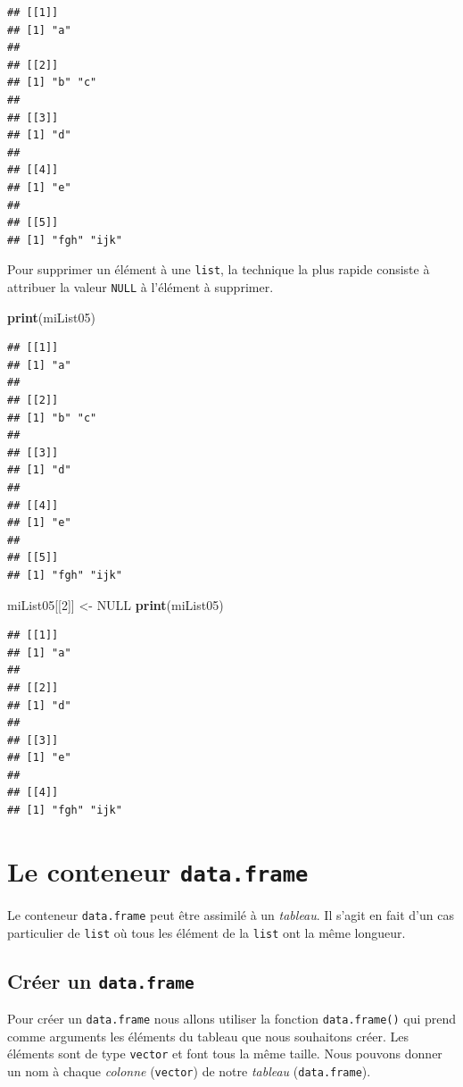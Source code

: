 \documentclass[]{book}
\newenvironment{Shaded}{\begin{snugshade}}{\end{snugshade}}
\newcommand{\KeywordTok}[1]{\textcolor[rgb]{0.13,0.29,0.53}{\textbf{#1}}}
\newcommand{\DecValTok}[1]{\textcolor[rgb]{0.00,0.00,0.81}{#1}}
\newcommand{\StringTok}[1]{\textcolor[rgb]{0.31,0.60,0.02}{#1}}
\newcommand{\OtherTok}[1]{\textcolor[rgb]{0.56,0.35,0.01}{#1}}
\newcommand{\NormalTok}[1]{#1}
\begin{document}
\begin{verbatim}
## [[1]]
## [1] "a"
## 
## [[2]]
## [1] "b" "c"
## 
## [[3]]
## [1] "d"
## 
## [[4]]
## [1] "e"
## 
## [[5]]
## [1] "fgh" "ijk"
\end{verbatim}

Pour supprimer un élément à une \texttt{list}, la technique la plus
rapide consiste à attribuer la valeur \texttt{NULL} à l'élément à
supprimer.

\begin{Shaded}
\begin{Highlighting}[]
\KeywordTok{print}\NormalTok{(miList05)}
\end{Highlighting}
\end{Shaded}

\begin{verbatim}
## [[1]]
## [1] "a"
## 
## [[2]]
## [1] "b" "c"
## 
## [[3]]
## [1] "d"
## 
## [[4]]
## [1] "e"
## 
## [[5]]
## [1] "fgh" "ijk"
\end{verbatim}

\begin{Shaded}
\begin{Highlighting}[]
\NormalTok{miList05[[}\DecValTok{2}\NormalTok{]] <-}\StringTok{ }\OtherTok{NULL}
\KeywordTok{print}\NormalTok{(miList05)}
\end{Highlighting}
\end{Shaded}

\begin{verbatim}
## [[1]]
## [1] "a"
## 
## [[2]]
## [1] "d"
## 
## [[3]]
## [1] "e"
## 
## [[4]]
## [1] "fgh" "ijk"
\end{verbatim}

\section{\texorpdfstring{Le conteneur
\texttt{data.frame}}{Le conteneur data.frame}}\label{le-conteneur-data.frame}

Le conteneur \texttt{data.frame} peut être assimilé à un \emph{tableau}.
Il s'agit en fait d'un cas particulier de \texttt{list} où tous les
élément de la \texttt{list} ont la même longueur.

\subsection{\texorpdfstring{Créer un
\texttt{data.frame}}{Créer un data.frame}}\label{creer-un-data.frame}

Pour créer un \texttt{data.frame} nous allons utiliser la fonction
\texttt{data.frame()} qui prend comme arguments les éléments du tableau
que nous souhaitons créer. Les éléments sont de type \texttt{vector} et
font tous la même taille. Nous pouvons donner un nom à chaque
\emph{colonne} (\texttt{vector}) de notre \emph{tableau}
(\texttt{data.frame}).
\end{document}
